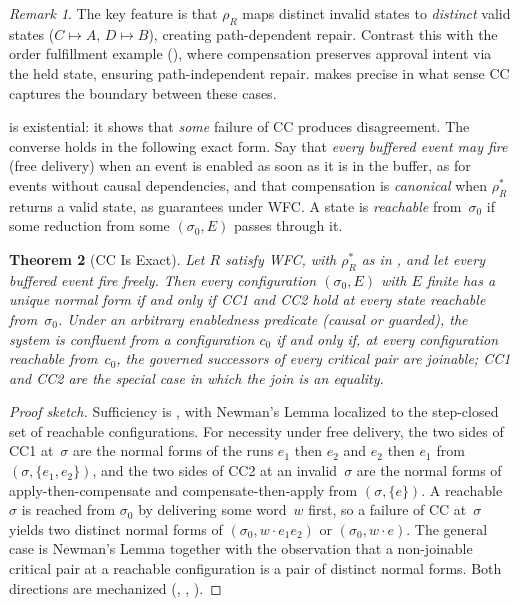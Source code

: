 \documentclass[11pt,a4paper]{article}
\theoremstyle{plain}
\newtheorem{theorem}{Theorem}[section]
\theoremstyle{definition}
\theoremstyle{remark}
\newtheorem{remark}[theorem]{Remark}
\begin{document}
\begin{remark}
The key feature is that $\rho_R$ maps distinct invalid states to
\emph{distinct} valid states ($C \mapsto A$, $D \mapsto B$), creating
path-dependent repair.  Contrast this with the order fulfillment example
(), where compensation preserves approval intent via the
held state, ensuring path-independent repair.   makes
precise in what sense CC captures the boundary between these cases.
\end{remark}

 is existential: it shows that \emph{some} failure of
CC produces disagreement.  The converse holds in the following exact form.
Say that \emph{every buffered event may fire} (free delivery) when an event is
enabled as soon as it is in the buffer, as for events without causal
dependencies, and that compensation is \emph{canonical} when $\rho_R^*$
returns a valid state, as  guarantees under WFC.  A state is
\emph{reachable} from~$\sigma_0$ if some reduction from some
$(\sigma_0, E)$ passes through it.

\begin{theorem}[CC Is Exact]
\label{thm:cc-exact}
Let $R$ satisfy WFC, with $\rho_R^*$ as in , and let every
buffered event fire freely.  Then every configuration $(\sigma_0, E)$ with $E$
finite has a unique normal form if and only if CC1 and CC2 hold at every
state reachable from~$\sigma_0$.  Under an arbitrary enabledness predicate
(causal or guarded), the system is confluent from a configuration $c_0$ if and
only if, at every configuration reachable from~$c_0$, the governed successors
of every critical pair are joinable; CC1 and CC2 are the special case in which
the join is an equality.
\end{theorem}

\begin{proof}[Proof sketch]
Sufficiency is , with Newman's Lemma localized to the
step-closed set of reachable configurations.  For necessity under free
delivery, the two sides of CC1 at~$\sigma$ are the normal forms of the runs
$e_1$ then $e_2$ and $e_2$ then $e_1$ from $(\sigma, \{e_1, e_2\})$, and the
two sides of CC2 at an invalid~$\sigma$ are the normal forms of
apply-then-compensate and compensate-then-apply from $(\sigma, \{e\})$.  A
reachable~$\sigma$ is reached from $\sigma_0$ by delivering some word~$w$
first, so a failure of CC at~$\sigma$ yields two distinct normal forms of
$(\sigma_0, w \cdot e_1 e_2)$ or $(\sigma_0, w \cdot e)$.  The general case is
Newman's Lemma together with the observation that a non-joinable critical pair
at a reachable configuration is a pair of distinct normal forms.  Both
directions are mechanized (, ,
).
\end{proof}
\end{document}
